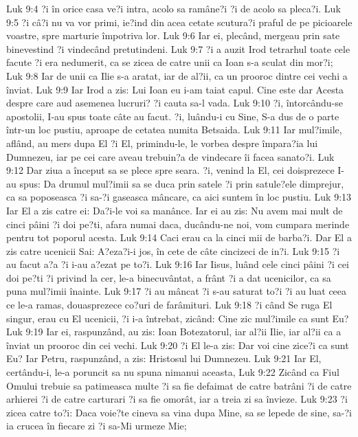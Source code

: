 Luk 9:4  ?i în orice casa ve?i intra, acolo sa ramâne?i ?i de acolo sa pleca?i.
Luk 9:5  ?i câ?i nu va vor primi, ie?ind din acea cetate scutura?i praful de pe picioarele voastre, spre marturie împotriva lor.
Luk 9:6  Iar ei, plecând, mergeau prin sate binevestind ?i vindecând pretutindeni.
Luk 9:7  ?i a auzit Irod tetrarhul toate cele facute ?i era nedumerit, ca se zicea de catre unii ca Ioan s-a sculat din mor?i;
Luk 9:8  Iar de unii ca Ilie s-a aratat, iar de al?ii, ca un prooroc dintre cei vechi a înviat.
Luk 9:9  Iar Irod a zis: Lui Ioan eu i-am taiat capul. Cine este dar Acesta despre care aud asemenea lucruri? ?i cauta sa-l vada.
Luk 9:10  ?i, întorcându-se apostolii, I-au spus toate câte au facut. ?i, luându-i cu Sine, S-a dus de o parte într-un loc pustiu, aproape de cetatea numita Betsaida.
Luk 9:11  Iar mul?imile, aflând, au mers dupa El ?i El, primindu-le, le vorbea despre împara?ia lui Dumnezeu, iar pe cei care aveau trebuin?a de vindecare îi facea sanato?i.
Luk 9:12  Dar ziua a început sa se plece spre seara. ?i, venind la El, cei doisprezece I-au spus: Da drumul mul?imii sa se duca prin satele ?i prin satule?ele dimprejur, ca sa poposeasca ?i sa-?i gaseasca mâncare, ca aici suntem în loc pustiu.
Luk 9:13  Iar El a zis catre ei: Da?i-le voi sa manânce. Iar ei au zis: Nu avem mai mult de cinci pâini ?i doi pe?ti, afara numai daca, ducându-ne noi, vom cumpara merinde pentru tot poporul acesta.
Luk 9:14  Caci erau ca la cinci mii de barba?i. Dar El a zis catre ucenicii Sai: A?eza?i-i jos, în cete de câte cincizeci de in?i.
Luk 9:15  ?i au facut a?a ?i i-au a?ezat pe to?i.
Luk 9:16  Iar Iisus, luând cele cinci pâini ?i cei doi pe?ti ?i privind la cer, le-a binecuvântat, a frânt ?i a dat ucenicilor, ca sa puna mul?imii înainte.
Luk 9:17  ?i au mâncat ?i s-au saturat to?i ?i au luat ceea ce le-a ramas, douasprezece co?uri de farâmituri.
Luk 9:18  ?i când Se ruga El singur, erau cu El ucenicii, ?i i-a întrebat, zicând: Cine zic mul?imile ca sunt Eu?
Luk 9:19  Iar ei, raspunzând, au zis: Ioan Botezatorul, iar al?ii Ilie, iar al?ii ca a înviat un prooroc din cei vechi.
Luk 9:20  ?i El le-a zis: Dar voi cine zice?i ca sunt Eu? Iar Petru, raspunzând, a zis: Hristosul lui Dumnezeu.
Luk 9:21  Iar El, certându-i, le-a poruncit sa nu spuna nimanui aceasta,
Luk 9:22  Zicând ca Fiul Omului trebuie sa patimeasca multe ?i sa fie defaimat de catre batrâni ?i de catre arhierei ?i de catre carturari ?i sa fie omorât, iar a treia zi sa învieze.
Luk 9:23  ?i zicea catre to?i: Daca voie?te cineva sa vina dupa Mine, sa se lepede de sine, sa-?i ia crucea în fiecare zi ?i sa-Mi urmeze Mie;
